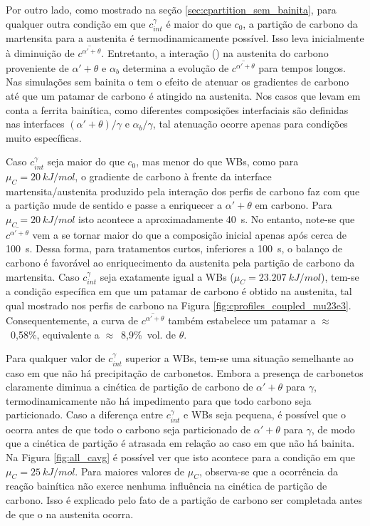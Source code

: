 Por outro lado, como mostrado na seção \ref{sec:cpartition_sem_bainita}, para qualquer outra condição em que $c^\gamma_{int}$ é maior do que $c_0$, a partição de carbono da martensita para a austenita é termodinamicamente possível. Isso leva inicialmente à diminuição de $\overline{c^{\alpha' + \theta}}$. Entretanto, a interação () na austenita do carbono proveniente de $\alpha' + \theta$ e $\alpha_b$ determina a evolução de $\overline{c^{\alpha' + \theta}}$ para tempos longos. Nas simulações sem bainita o  tem o efeito de atenuar os gradientes de carbono até que um patamar de carbono é atingido na austenita. Nos casos que levam em conta a ferrita bainítica, como diferentes composições interfaciais são definidas nas interfaces $(\alpha' + \theta)/\gamma$ e $\alpha_b/\gamma$, tal atenuação ocorre apenas para condições muito específicas.

Caso $c^\gamma_{int}$ seja maior do que $c_0$, mas menor do que WBs, como para $\mu_C = \SI{20}{kJ/mol}$, o gradiente de carbono à frente da interface martensita/austenita produzido pela interação dos perfis de carbono faz com que a partição mude de sentido e passe a enriquecer a $\alpha' + \theta$ em carbono. Para $\mu_C = \SI{20}{kJ/mol}$ isto acontece a aproximadamente 40~s. No entanto, note-se que $\overline{c^{\alpha' + \theta}}$ vem a se tornar maior do que a composição inicial apenas após cerca de 100~s. Dessa forma, para tratamentos curtos, inferiores a 100~s, o balanço de carbono é favorável ao enriquecimento da austenita pela partição de carbono da martensita. Caso $c^\gamma_{int}$ seja exatamente igual a WBs ($\mu_C = \SI{23.207}{kJ/mol}$), tem-se a condição específica em que um patamar de carbono é obtido na austenita, tal qual mostrado nos perfis de carbono na Figura \ref{fig:cprofiles_coupled_mu23e3}. Consequentemente, a curva de $\overline{c^{\alpha' + \theta}}$ também estabelece um patamar a $\approx$~0,58\%, equivalente a $\approx$~8,9\%~vol. de $\theta$.

Para qualquer valor de $c^\gamma_{int}$ superior a WBs, tem-se uma situação semelhante ao caso em que não há precipitação de carbonetos. Embora a presença de carbonetos claramente diminua a cinética de partição de carbono de $\alpha' + \theta$ para $\gamma$, termodinamicamente não há impedimento para que todo carbono seja particionado. Caso a diferença entre $c^\gamma_{int}$ e WBs seja pequena, é possível que o  ocorra antes de que todo o carbono seja particionado de $\alpha' + \theta$ para $\gamma$, de modo que a cinética de partição é atrasada em relação ao caso em que não há bainita. Na Figura \ref{fig:all_cavg} é possível ver que isto acontece para a condição em que $\mu_C = \SI{25}{kJ/mol}$. Para maiores valores de $\mu_C$, observa-se que a ocorrência da reação bainítica não exerce nenhuma influência na cinética de partição de carbono. Isso é explicado pelo fato de a partição de carbono ser completada antes de que o  na austenita ocorra.


